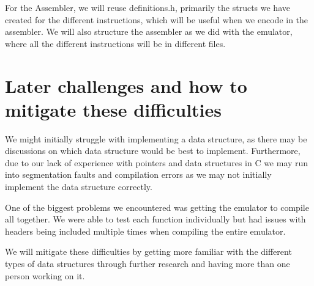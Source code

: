 \documentclass{article}
\begin{document}
For the Assembler, we will reuse definitions.h, primarily the structs we have created for the different instructions, which will be useful when we encode in the assembler. We will also structure the assembler as we did with the emulator, where all the different instructions will be in different files.

\section{Later challenges and how to mitigate these difficulties}

We might initially struggle with implementing a data structure, as there may be discussions on which data structure would be best to implement. Furthermore, due to our lack of experience with pointers and data structures in C we may run into segmentation faults and compilation errors as we may not initially implement the data structure correctly.

One of the biggest problems we encountered was getting the emulator to compile all together. We were able to test each function individually but had issues with headers being included multiple times when compiling the entire emulator.

We will mitigate these difficulties by getting more familiar with the different types of data structures through further research and having more than one person working on it.
\end{document}
